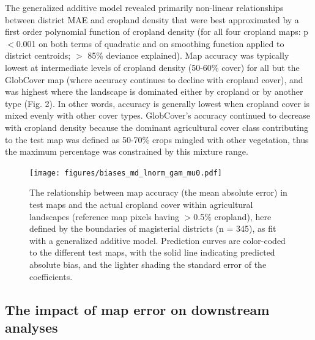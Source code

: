 \documentclass[a4paper]{article}
\begin{document}
The generalized additive model revealed primarily non-linear relationships between district MAE and cropland density that were best approximated by a first order polynomial function of cropland density (for all four cropland maps: p$<$0.001 on both terms of quadratic and on smoothing function applied to district centroids; $>$ 85\% deviance explained). Map accuracy was typically lowest at intermediate levels of cropland density (50-60\% cover) for all but the GlobCover map (where accuracy continues to decline with cropland cover), and was highest where the landscape is dominated either by cropland or by another type (Fig. 2). In other words, accuracy is generally lowest when cropland cover is mixed evenly with other cover types. GlobCover's accuracy continued to decrease with cropland density because the dominant agricultural cover class contributing to the test map was defined as 50-70\% crops mingled with other vegetation, thus the maximum percentage was constrained by this mixture range.  

\begin{figure}[!h]
\centerline{\texttt{[image: figures/biases\_md\_lnorm\_gam\_mu0.pdf]}}
\caption{The relationship between map accuracy (the mean absolute error) in test maps and the actual cropland cover within agricultural landscapes (reference map pixels having $>$0.5\% cropland), here defined by the boundaries of magisterial districts (n = 345), as fit with a generalized additive model. Prediction curves are color-coded to the different test maps, with the solid line indicating predicted absolute bias, and the lighter shading the standard error of the coefficients.}\label{afoto2}
\end{figure}


\vspace{-0.3 cm}
\subsection*{The impact of map error on downstream analyses}
\vspace{-0.2 cm}
\end{document}
